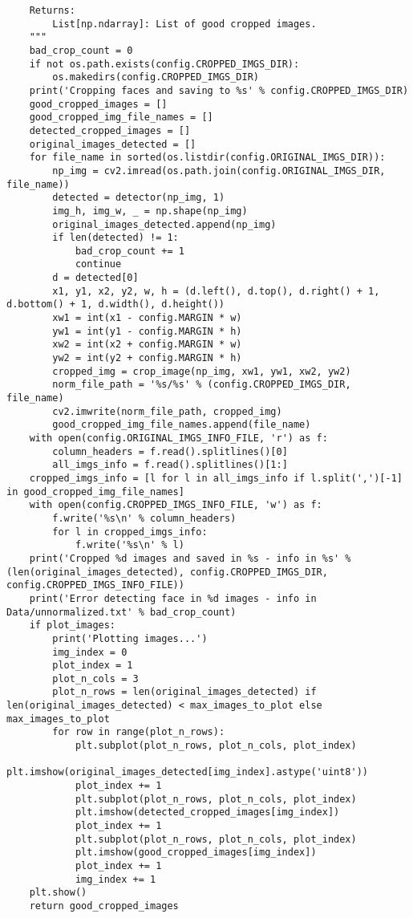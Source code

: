 \begin{verbatim}
    Returns:
        List[np.ndarray]: List of good cropped images.
    """
    bad_crop_count = 0
    if not os.path.exists(config.CROPPED_IMGS_DIR):
        os.makedirs(config.CROPPED_IMGS_DIR)
    print('Cropping faces and saving to %s' % config.CROPPED_IMGS_DIR)
    good_cropped_images = []
    good_cropped_img_file_names = []
    detected_cropped_images = []
    original_images_detected = []
    for file_name in sorted(os.listdir(config.ORIGINAL_IMGS_DIR)):
        np_img = cv2.imread(os.path.join(config.ORIGINAL_IMGS_DIR, file_name))
        detected = detector(np_img, 1)
        img_h, img_w, _ = np.shape(np_img)
        original_images_detected.append(np_img)
        if len(detected) != 1:
            bad_crop_count += 1
            continue
        d = detected[0]
        x1, y1, x2, y2, w, h = (d.left(), d.top(), d.right() + 1, d.bottom() + 1, d.width(), d.height())
        xw1 = int(x1 - config.MARGIN * w)
        yw1 = int(y1 - config.MARGIN * h)
        xw2 = int(x2 + config.MARGIN * w)
        yw2 = int(y2 + config.MARGIN * h)
        cropped_img = crop_image(np_img, xw1, yw1, xw2, yw2)
        norm_file_path = '%s/%s' % (config.CROPPED_IMGS_DIR, file_name)
        cv2.imwrite(norm_file_path, cropped_img)
        good_cropped_img_file_names.append(file_name)
    with open(config.ORIGINAL_IMGS_INFO_FILE, 'r') as f:
        column_headers = f.read().splitlines()[0]
        all_imgs_info = f.read().splitlines()[1:]
    cropped_imgs_info = [l for l in all_imgs_info if l.split(',')[-1] in good_cropped_img_file_names]
    with open(config.CROPPED_IMGS_INFO_FILE, 'w') as f:
        f.write('%s\n' % column_headers)
        for l in cropped_imgs_info:
            f.write('%s\n' % l)
    print('Cropped %d images and saved in %s - info in %s' % (len(original_images_detected), config.CROPPED_IMGS_DIR, config.CROPPED_IMGS_INFO_FILE))
    print('Error detecting face in %d images - info in Data/unnormalized.txt' % bad_crop_count)
    if plot_images:
        print('Plotting images...')
        img_index = 0
        plot_index = 1
        plot_n_cols = 3
        plot_n_rows = len(original_images_detected) if len(original_images_detected) < max_images_to_plot else max_images_to_plot
        for row in range(plot_n_rows):
            plt.subplot(plot_n_rows, plot_n_cols, plot_index)
            plt.imshow(original_images_detected[img_index].astype('uint8'))
            plot_index += 1
            plt.subplot(plot_n_rows, plot_n_cols, plot_index)
            plt.imshow(detected_cropped_images[img_index])
            plot_index += 1
            plt.subplot(plot_n_rows, plot_n_cols, plot_index)
            plt.imshow(good_cropped_images[img_index])
            plot_index += 1
            img_index += 1
    plt.show()
    return good_cropped_images


\end{verbatim}
